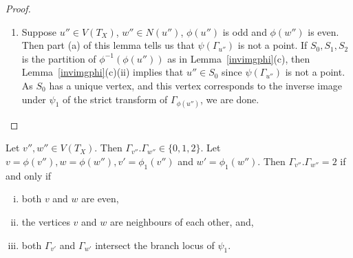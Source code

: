 \begin{proof}
\begin{enumerate}
\item Suppose $u'' \in V(T_X)$, $w'' \in N(u'')$, $\phi(u'')$ is odd and $\phi(w'')$ is even. Then part (a) of this lemma tells us that $\psi(\Gamma_{u''})$ is not a point. If $S_0,S_1,S_2$ is the partition of $\phi^{-1}(\phi(u''))$ as in Lemma~\ref{invimgphi}(c), then Lemma~\ref{invimgphi}(c)(ii) implies that $u'' \in S_0$ since $\psi(\Gamma_{u''})$ is not a point. As $S_0$ has a unique vertex, and this vertex corresponds to the inverse image under $\psi_1$ of the strict transform of $\Gamma_{\phi(u'')}$, we are done.
\qedhere
\end{enumerate}
\end{proof}


\begin{lemma}\label{intersect}
 Let $v'',w'' \in V(T_X)$. Then $\Gamma_{v''}.\Gamma_{w''} \in \{ 0,1,2 \}$. Let $v = \phi(v''), w = \phi(w''), v' = \phi_1(v'')$ and $w' = \phi_1(w'')$. Then $\Gamma_{v''}.\Gamma_{w''} = 2$ if and only if
 \begin{enumerate}[(i)]
  \item both $v$ and $w$ are even,
  \item the vertices $v$ and $w$ are neighbours of each other, and,
  \item both $\Gamma_{v'}$ and $\Gamma_{w'}$ intersect the branch locus of $\psi_1$.
\end{enumerate}
\end{lemma}
